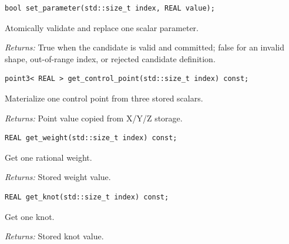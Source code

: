 \par\noindent\begin{minipage}{\linewidth}
\begin{lstlisting}[style=apireference]
bool set_parameter(std::size_t index, REAL value);
\end{lstlisting}
{\footnotesize Atomically validate and replace one scalar parameter.\par}
{\footnotesize\textit{Returns:} True when the candidate is valid and committed; false for an invalid shape, out-of-range index, or rejected candidate definition.\par}
\end{minipage}\par\vspace{1pt}
\par\noindent\begin{minipage}{\linewidth}
\begin{lstlisting}[style=apireference]
point3< REAL > get_control_point(std::size_t index) const;
\end{lstlisting}
{\footnotesize Materialize one control point from three stored scalars.\par}
{\footnotesize\textit{Returns:} Point value copied from X/Y/Z storage.\par}
\end{minipage}\par\vspace{1pt}
\par\noindent\begin{minipage}{\linewidth}
\begin{lstlisting}[style=apireference]
REAL get_weight(std::size_t index) const;
\end{lstlisting}
{\footnotesize Get one rational weight.\par}
{\footnotesize\textit{Returns:} Stored weight value.\par}
\end{minipage}\par\vspace{1pt}
\par\noindent\begin{minipage}{\linewidth}
\begin{lstlisting}[style=apireference]
REAL get_knot(std::size_t index) const;
\end{lstlisting}
{\footnotesize Get one knot.\par}
{\footnotesize\textit{Returns:} Stored knot value.\par}
\end{minipage}\par\vspace{1pt}
